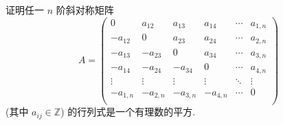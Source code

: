\documentclass[color=black,device=normal,lang=cn,mode=geye]{elegantnote}
\begin{document}
\begin{exercise}[有修改]%
    证明任一 $n$ 阶斜对称矩阵
    \[A=\begin{pmatrix}
        0 & a_{12} & a_{13} & a_{14} & \cdots & a_{1,n} \\
        -a_{12} & 0 & a_{23} & a_{24} & \cdots & a_{2,n} \\
        -a_{13} & -a_{23} & 0 & a_{34} & \cdots & a_{3,n} \\
        -a_{14} & -a_{24} & -a_{34} & 0 & \cdots & a_{4,n} \\
        \vdots & \vdots & \vdots & \vdots & \ddots & \vdots \\
        -a_{1,n} & -a_{2,n} & -a_{3,n} & -a_{4,n} & \cdots & 0 \\
    \end{pmatrix}\]
    (其中 $a_{ij}\in\mathbb{Z}$) 的行列式是一个有理数的平方.
\end{exercise}
\end{document}
